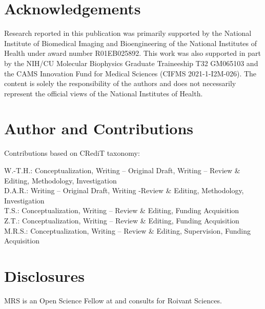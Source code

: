 \documentclass[9pt]{elife}
\begin{document}
\section{Acknowledgements}
Research reported in this publication was primarily supported by the National Institute of Biomedical Imaging and Bioengineering of the National Institutes of Health under award number R01EB025892. This work was also supported in part by the NIH/CU Molecular Biophysics Graduate Traineeship T32 GM065103 and the CAMS Innovation Fund for Medical Sciences (CIFMS 2021-1-I2M-026). The content is solely the responsibility of the authors and does not necessarily represent the official views of the National Institutes of Health.

\section{Author and Contributions}
Contributions based on CRediT taxonomy:

\noindent W.-T.H.: Conceptualization, Writing – Original Draft, Writing – Review \& Editing, Methodology, Investigation \\
D.A.R.: Writing – Original Draft, Writing -Review \& Editing, Methodology, Investigation  \\
T.S.: Conceptualization, Writing – Review \& Editing, Funding Acquisition \\
Z.T.: Conceptualization, Writing – Review \& Editing, Funding Acquisition \\
M.R.S.: Conceptualization, Writing – Review \& Editing, Supervision, Funding Acquisition \\

\section{Disclosures}
MRS is an Open Science Fellow at and consults for Roivant Sciences.




\clearpage

\clearpage
\end{document}
